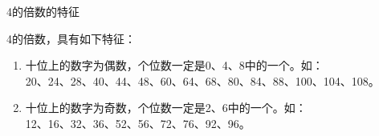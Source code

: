 \documentclass[aspectratio=169]{ctexbeamer} %
\date{\today}
\begin{document}
\begin{frame}[t]{4的倍数的特征}
\begin{spacing}{1.2}
\normalsize
4的倍数，具有如下特征：
\begin{enumerate}[label={\arabic*.}]
\item \alert{十位上的数字为偶数，个位数一定是0、4、8中的一个。如：}\\
20、24、28、40、44、48、60、64、68、80、84、88、100、104、108。 
\item \alert{十位上的数字为奇数，个位数一定是2、6中的一个。如：}\\
12、16、32、36、52、56、72、76、92、96。 
\end{enumerate}

\end{spacing}
\end{frame}
\end{document}
